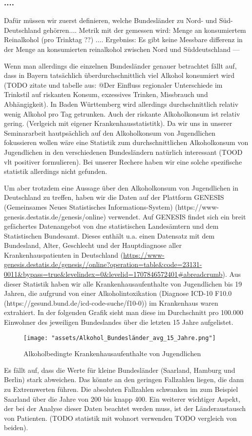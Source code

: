 \documentclass{article}
\begin{document}
\subsubsection {....}
Dafür müssen wir zuerst definieren, welche Bundesländer zu Nord- und Süd- Deutschland gehörren.... 
Metrik mit der gemessen wird: Menge an konsumiertem Reinalkohol (pro Trinktag ??)
....
Ergebniss: Es gibt keine Messbare differenz in der Menge an konsumierten reinalkohol zwischen Nord und Süddeutschland
---

Wenn man allerdings die einzelnen Bundesländer genauer betrachtet fällt auf, dass in Bayern tatsächlich überdurchschnittlich viel Alkohol konsumiert wird (TODO zitate und tabelle aus: @Der Einfluss regionaler Unterschiede im Trinkstil auf riskanten Konsum, exzessives Trinken, Missbrauch und Abhängigkeit). In Baden Württemberg wird allerdings durchschnittlich relativ wenig Alkohol pro Tag getrunken. Auch der riskante Alkoholkonsum ist relativ gering. (Verlgeich mit eigener Krankenhausstatistitk). Da wir uns in unserer Seminararbeit hautpsächlich auf den Alkoholkonsum von Jugendlichen fokussieren wollen wäre eine Statistik zum durchschnittlichen Alkoholkonsum von Jugendlichen in den verschiedenen Bundesländern natürlich interessant (TOOD vlt positiver formulieren). Bei unserer Rechere haben wir eine solche spezifische statistik allerdings nicht gefunden. 

Um aber trotzdem eine Aussage über den Alkoholkonsum von Jugendlichen in Deutschland zu treffen, haben wir die Daten auf der Plattform GENESIS (Gemeinsames Neues Statistisches Informations-System) (https://www-genesis.destatis.de/genesis/online) verwendet. Auf GENESIS findet sich ein breit  gefächertes Datenangebot von dne statistischen Landesämtern und dem Statistischen Bundesamt. Dieses enthält u.a. einen Datensatz mit dem Bundesland, Alter, Geschlecht und der Hauptdiagnose aller Krankenhauspatienten in Deutschland (\url{https://www-genesis.destatis.de/genesis//online?operation=table&code=23131-0011&bypass=true&levelindex=0&levelid=1707846572401#abreadcrumb}). Aus dieser Statistik haben wir alle Krankenhausaufenthalte von Jugendlichen bis 19 Jahren, die aufgrund von einer Alkoholintoxikation (Diagnose ICD-10 F10.0 (https://gesund.bund.de/icd-code-suche/f10-0)) im Krankenhaus waren extrahiert. In der folgenden Grafik sieht man diese im Durchschnitt pro 100.000 Einwohner des jeweiligen Bundeslandes über die letzten 15 Jahre aufgelistet.

\begin{figure}[h]
    \centering
    \texttt{[image: "assets/Alkohol\_Bundesländer\_avg\_15\_Jahre.png"]}
    \caption{Alkoholbedingte Krankenhausaufenthalte von Jugendlichen}
    \label{fig:1}
\end{figure}

Es fällt auf, dass die Werte für kleine Bundesländer (Saarland, Hamburg und Berlin) stark abweichen. Das könnte an den geringen Fallzahlen liegen, die dann zu Extremwerten führen. Die absoluten Fallzahlen schwanken im zum Beispiel Saarland über die Jahre von 200 bis knapp 400. Ein weiterer wichtiger Aspekt, der bei der Analyse dieser Daten beachtet werden muss, ist der Länderaustausch von Patienten. (TODO statistik mit wohnort verwenden TODO vergleich von beiden).
\end{document}
